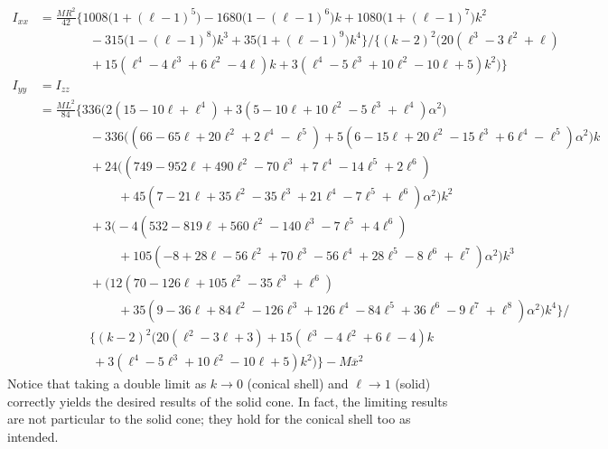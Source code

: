 \documentclass[11pt,dvipsnames]{thesis}
\begin{document}
\begin{align}
I_{xx} &= \frac{MR^2}{42} \Bigg\{1008\big(1 + (\ell - 1)^5\big) - 1680\big(1 - (\ell - 1)^6\big)k + 1080\big(1 + (\ell - 1)^7\big)k^2 \nonumber \\
&\qquad\qquad - 315\big(1 - (\ell - 1)^8\big)k^3 + 35\big(1 + (\ell - 1)^9\big)k^4\Bigg\} / \Bigg\{(k - 2)^2 \Big(20(\ell^3 - 3\ell^2 + \ell) \nonumber \\
&\qquad\qquad + 15(\ell^4 - 4\ell^3 + 6\ell^2 - 4\ell)k + 3(\ell^4 - 5\ell^3 + 10\ell^2 - 10\ell + 5)k^2 \Big)\Bigg\} \\
I_{yy} &= I_{zz} \\
&= \frac{M L^2}{84}
\Bigg\{
336\Big(2(15 - 10\ell + \ell^4) + 3(5 - 10\ell + 10\ell^2 - 5\ell^3 + \ell^4)\alpha^2\Big) \nonumber \\
&\qquad\qquad - 336\Big((66 - 65\ell + 20\ell^2 + 2\ell^4 - \ell^5) + 5(6 - 15\ell + 20\ell^2 - 15\ell^3 + 6\ell^4 - \ell^5)\alpha^2\Big)k \nonumber \\
&\qquad\qquad +  24\Big((749 - 952\ell + 490\ell^2 - 70\ell^3 + 7\ell^4 - 14\ell^5 + 2\ell^6) \nonumber \\
&\qquad\qquad\qquad\  + 45 (7 - 21\ell + 35\ell^2 - 35\ell^3 + 21\ell^4 - 7\ell^5 + \ell^6)\alpha^2\Big)k^2 \nonumber \\
&\qquad\qquad +   3\Big(-4(532 - 819\ell + 560\ell^2 - 140\ell^3 - 7\ell^5 + 4\ell^6) \nonumber \\
&\qquad\qquad\qquad\  + 105(-8 + 28\ell - 56\ell^2 + 70\ell^3 - 56\ell^4 + 28\ell^5 - 8\ell^6 + \ell^7)\alpha^2\Big)k^3 \nonumber \\
&\qquad\qquad +    \Big(12(70 - 126\ell + 105\ell^2 - 35\ell^3 + \ell^6) \nonumber \\
&\qquad\qquad\qquad\  + 35(9 - 36\ell + 84\ell^2 - 126\ell^3 + 126\ell^4 - 84\ell^5 + 36\ell^6 - 9\ell^7 + \ell^8)\alpha^2\Big)k^4
\Bigg\}
/ \nonumber \\
&\qquad\qquad \Bigg\{
(k-2)^2 \Big(20(\ell^2 - 3\ell + 3) + 15(\ell^3 - 4\ell^2 + 6\ell - 4)k \nonumber \\
&\qquad\qquad\ + 3(\ell^4 - 5\ell^3 + 10\ell^2 - 10\ell+ 5)k^2 \Big)
\Bigg\} %
 - M\overline{x}^2
\end{align}
Notice that taking a double limit as $k \to 0$ (conical shell) and $\ell \to 1$ (solid) correctly yields the desired results of the solid cone. In fact, the limiting results are not particular to the solid cone; they hold for the conical shell too as intended.
\end{document}
